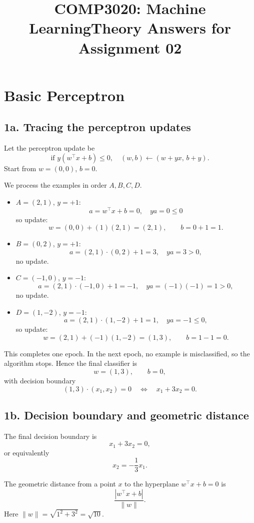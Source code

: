 \documentclass[11pt]{article}
\title{COMP3020: Machine Learning\newline Theory Answers for Assignment 02}
\author{}
\date{}
\begin{document}
\maketitle

\section{Basic Perceptron}

\subsection*{1a. Tracing the perceptron updates}

Let the perceptron update be
\[
\text{if } y(w^\top x+b)\le 0,\quad
(w,b)\leftarrow (w+yx,\, b+y).
\]
Start from $w=(0,0)$, $b=0$.

We process the examples in order $A,B,C,D$.

\begin{itemize}[leftmargin=1.5em]
  \item $A=(2,1)$, $y=+1$:
  \[
  a = w^\top x+b = 0,\quad y a=0 \le 0
  \]
  so update:
  \[
  w=(0,0)+(1)(2,1)=(2,1),\qquad b=0+1=1.
  \]

  \item $B=(0,2)$, $y=+1$:
  \[
  a=(2,1)\cdot(0,2)+1=3,\quad y a=3>0,
  \]
  no update.

  \item $C=(-1,0)$, $y=-1$:
  \[
  a=(2,1)\cdot(-1,0)+1=-1,\quad y a = (-1)(-1)=1>0,
  \]
  no update.

  \item $D=(1,-2)$, $y=-1$:
  \[
  a=(2,1)\cdot(1,-2)+1=1,\quad y a=-1\le 0,
  \]
  so update:
  \[
  w=(2,1)+(-1)(1,-2)=(1,3),\qquad b=1-1=0.
  \]
\end{itemize}

This completes one epoch. In the next epoch, no example is misclassified, so the algorithm stops.
Hence the final classifier is
\[
w=(1,3),\qquad b=0,
\]
with decision boundary
\[
(1,3)\cdot(x_1,x_2)=0 \quad\Longleftrightarrow\quad x_1+3x_2=0.
\]

\subsection*{1b. Decision boundary and geometric distance}

The final decision boundary is
\[
x_1+3x_2=0,
\]
or equivalently
\[
x_2=-\frac{1}{3}x_1.
\]

The geometric distance from a point $x$ to the hyperplane $w^\top x+b=0$ is
\[
\frac{|w^\top x+b|}{\|w\|}.
\]
Here $\|w\|=\sqrt{1^2+3^2}=\sqrt{10}$.
\end{document}
